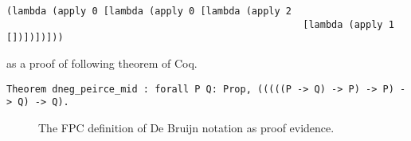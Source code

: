 \begin{lstlisting}[basicstyle=\ttfamily,language=lprolog]
(lambda (apply 0 [lambda (apply 0 [lambda (apply 2 
                                                    [lambda (apply 1 [])])])]))
\end{lstlisting}
as a proof of following theorem of Coq.
\begin{lstlisting}[basicstyle=\ttfamily,language=lprolog]
Theorem dneg_peirce_mid : forall P Q: Prop, (((((P -> Q) -> P) -> P) -> Q) -> Q).
\end{lstlisting}

\begin{figure}


\caption{The FPC definition of De Bruijn notation as proof evidence.}
\label{fig:debruijn}
\end{figure}





